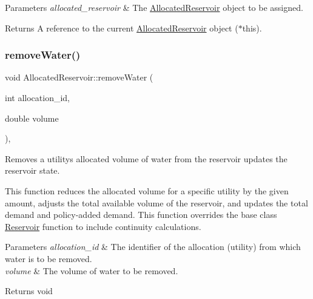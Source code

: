 \begin{DoxyParams}{Parameters}
{\em allocated\+\_\+reservoir} & The {\ttfamily \mbox{\hyperlink{classAllocatedReservoir}{Allocated\+Reservoir}}} object to be assigned.\\
\hline
\end{DoxyParams}
\begin{DoxyReturn}{Returns}
A reference to the current {\ttfamily \mbox{\hyperlink{classAllocatedReservoir}{Allocated\+Reservoir}}} object ({\ttfamily $\ast$this}). 
\end{DoxyReturn}
\mbox{\label{classAllocatedReservoir_a3a9b7ce2e1d42cc373095cfd40ef2ae2}} 
\subsubsection{\texorpdfstring{remove\+Water()}{removeWater()}}
{\footnotesize\ttfamily void Allocated\+Reservoir\+::remove\+Water (\begin{DoxyParamCaption}\item[{int}]{allocation\+\_\+id,  }\item[{double}]{volume }\end{DoxyParamCaption})\hspace{0.3cm}{\ttfamily [override]}, {\ttfamily [virtual]}}



Removes a utility\textquotesingle{}s allocated volume of water from the reservoir updates the reservoir state. 

This function reduces the allocated volume for a specific utility by the given amount, adjusts the total available volume of the reservoir, and updates the total demand and policy-\/added demand. This function overrides the base class {\ttfamily \mbox{\hyperlink{classReservoir}{Reservoir}}} function to include continuity calculations.


\begin{DoxyParams}{Parameters}
{\em allocation\+\_\+id} & The identifier of the allocation (utility) from which water is to be removed. \\
\hline
{\em volume} & The volume of water to be removed.\\
\hline
\end{DoxyParams}
\begin{DoxyReturn}{Returns}
void 
\end{DoxyReturn}


